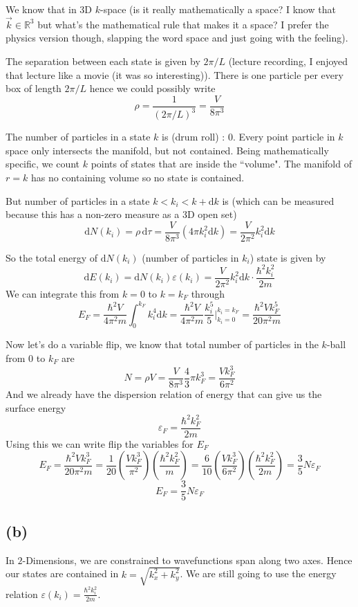 \documentclass[letter, 10pts]{article}
\newcommand{\hb}{\hbar}
\begin{document}
We know that in 3D $k$-space (is it really mathematically a space? I know that $\vec{k} \in  \mathbb{R}^{3}$ but what's the mathematical rule that makes it a space? I prefer the physics version though, slapping the word space and just going with the feeling).

The separation between each state is given by $2\pi / L$ (lecture recording, I enjoyed that lecture like a movie (it was so interesting)). There is one particle per every box of length $2 \pi / L$ hence we could possibly write
\[
\rho = \frac{1}{(2 \pi / L)^3} = \frac{V}{8 \pi^3}
\] 

The number of particles in a state $k$ is (drum roll) : 0. Every point particle in $k$ space only intersects the manifold, but not contained. Being mathematically specific, we count $k$ points of states that are inside the ``volume". The manifold of $r = k$ has no containing volume so no state is contained. 

But number of particles in a state $k < k_i < k+ \mathrm{d} k$ is (which can be measured because this has a non-zero measure as a 3D open set)
\[
	\mathrm{d} N(k_i) = \rho \, \mathrm{d} \mathcal{\tau} =  \frac{V}{8 \pi ^3}(4 \pi k_i ^2 \mathrm{d} k)  = \frac{V}{2 \pi^2} k_i^2 \mathrm{d} k 
\]

So the total energy of $\mathrm{d} N(k_i)$ (number of particles in $k_i$) state is given by 
\[
\mathrm{d} E(k_i) = \mathrm{d} N(k_i) \varepsilon(k_i) = \frac{V}{2 \pi^2} k_i^2 \mathrm{d} k \cdot \frac{\hb^2 k_i^2}{2 m }   
\]
We can integrate this from $k = 0$ to $k = k_F$ through 
\[ E_F = 
	\frac{\hb^2 V}{4 \pi^2 m } \int_{0}^{k_F}   k_i ^{4} \mathrm{d} k = \frac{\hb ^2 V}{4 \pi^2 m} \frac{k_i ^{5}}{5} \Biggr|_{k_i= 0 }^{k_i = k_F} = \frac{\hb^2 V k_F ^{5}}{20 \pi ^2 m  }
\]  

Now let's do a variable flip, we know that total number of particles in the $k$-ball from $0$ to $k_F$ are 
\[
N = \rho V = \frac{V}{8 \pi ^3}\frac{4}{3} \pi k_F ^3 = \frac{V k_F ^3}{6 \pi ^2}
\] 
And we already have the dispersion relation of energy that can give us the surface energy 
\[
\varepsilon_F = \frac{\hb ^2 k_F ^2}{2 m }
\] 
Using this we can write flip the variables for $E_F$
\[
E_F =
\frac{\hb^2 V k_F^3}{20 \pi^2 m } = 
\frac{1}{20}
\left( \frac{V k_F^3 }{ \pi^2 }\right)
\left(\frac{\hb^2 k_F^2}{m}\right)
= \frac{6}{10}
\left( \frac{V k_F^3 }{ 6\pi^2 }\right)
\left(\frac{\hb^2 k_F^2}{2m}\right) = \frac{3}{5} N \varepsilon_F
\] 
\[
\boxed{
E_F = \frac{3}{5} N \varepsilon_F 
}
\] 


\subsection*{(b)} 
In $2$-Dimensions, we are constrained to wavefunctions span along two axes. Hence our states are contained in $k = \sqrt{k_x^2 + k_y^2} $. We are still going to use the energy relation $\varepsilon(k_i) = \frac{\hb ^2 k_i ^2}{2 m} $.
\end{document}
